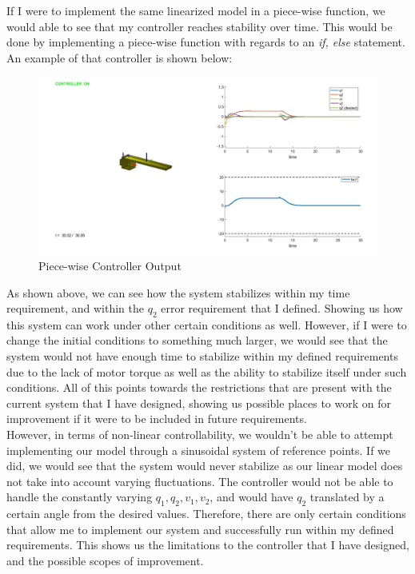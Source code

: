 \documentclass[12pt]{article}
\begin{document}
If I were to implement the same linearized model in a piece-wise function, we would able to see that my controller reaches stability over time. This would be done by implementing a piece-wise function with regards to an \textit{if, else} statement. An example of that controller is shown below:

\begin{figure}[H]
	\centering
	\includegraphics[width=0.7\linewidth]{piece-wise.jpg}
	\caption{Piece-wise Controller Output}
\end{figure}

As shown above, we can see how the system stabilizes within my time requirement, and within the $q_{2}$ error requirement that I defined. Showing us how this system can work under other certain conditions as well. However, if I were to change the initial conditions to something much larger, we would see that the system would not have enough time to stabilize within my defined requirements due to the lack of motor torque as well as the ability to stabilize itself under such conditions. All of this points towards the restrictions that are present with the current system that I have designed, showing us possible places to work on for improvement if it were to be included in future requirements.\\

However, in terms of non-linear controllability, we wouldn't be able to attempt implementing our model through a sinusoidal system of reference points. If we did, we would see that the system would never stabilize as our linear model does not take into account varying fluctuations. The controller would not be able to handle the constantly varying \textit{$q_{1},q_{2},v_{1},v_{2}$}, and would have $q_{2}$ translated by a certain angle from the  desired values. Therefore, there are only certain conditions that allow me to implement our system and successfully run within my defined requirements. This shows us the limitations to the controller that I have designed, and the possible scopes of improvement.
\end{document}
